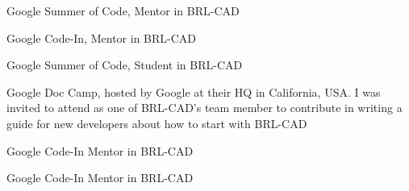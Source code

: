     {Google Summer of Code,}
    {}
    {Mentor in BRL-CAD}
    {}
    {}

    {Google Code-In,}
    {}
    {Mentor in BRL-CAD}
    {}
    {}

    {Google Summer of Code,}
    {}
    {Student in BRL-CAD}
    {}
    {}

    {Google Doc Camp,}
    {}
    {hosted by Google at their HQ in California, USA. I was invited to attend as one of BRL-CAD's team member to contribute in writing a guide for new developers about how to start with BRL-CAD}
    {}
    {}

    {Google Code-In}
    {}
    {Mentor in BRL-CAD}
    {}
    {}

    {Google Code-In}
    {}
    {Mentor in BRL-CAD}
    {}
    {}
